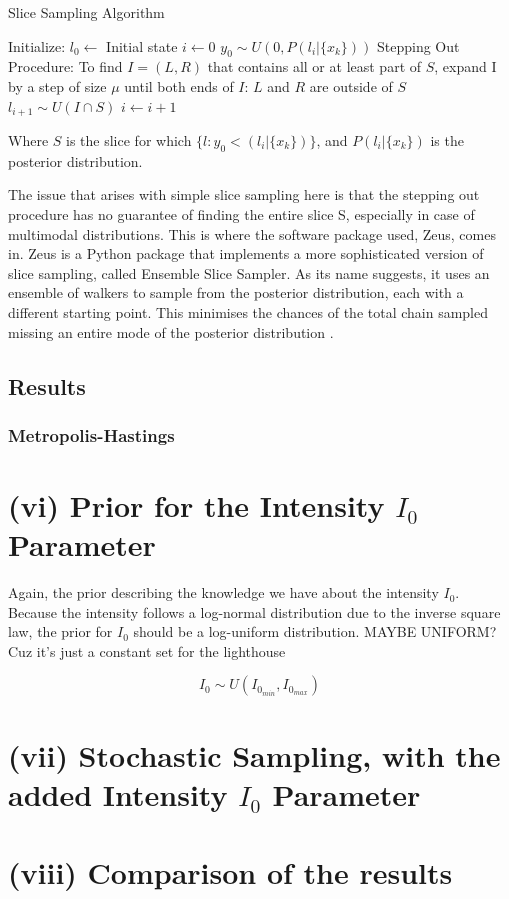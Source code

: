 \documentclass[12pt]{report} %
\begin{document}
\begin{definitionbox}{Slice Sampling Algorithm \cite{karamanis_zeus}}
\fontsize{8}{12}\selectfont
    \begin{algorithmic}[1]
        \State Initialize:
        \State \quad $l_0 \gets$ Initial state
        \State \quad $i \gets 0$
         
            \State $y_{0} \sim U(0, P(l_{i}|\{x_{k}\}))$
            \State Stepping Out Procedure: To find $I = (L, R)$ that contains all or at least part of $S$, expand I by a step of size $\mu$ until both ends of $I$: $L$ and $R$ are outside of $S$
            \State $l_{i+1} \sim U(I \cap S)$ 
            \State $i \gets i + 1$
        \EndWhile
    \end{algorithmic}
    Where $S$ is the slice for which $\{l: y_{0} < (l_{i}|\{x_{k}\})\}$, and $P(l_{i}|\{x_{k}\})$ is the posterior distribution.
\end{definitionbox}

The issue that arises with simple slice sampling here is that the stepping out procedure has no guarantee of finding the entire slice S, especially in case of multimodal distributions. This is where the software package used, Zeus, comes in. Zeus is a Python package that implements a more sophisticated version of slice sampling, called Ensemble Slice Sampler. As its name suggests, it uses an ensemble of walkers to sample from the posterior distribution, each with a different starting point. This minimises the chances of the total chain sampled missing an entire mode of the posterior distribution \cite{karamanis_zeus}.


\subsection*{Results}

\subsubsection*{Metropolis-Hastings}




\section*{(vi) Prior for the Intensity $I_{0}$ Parameter}

Again, the prior describing the knowledge we have about the intensity $I_{0}$. Because the intensity follows a log-normal distribution due to the inverse square law, the prior for $I_{0}$ should be a log-uniform distribution. MAYBE UNIFORM? Cuz it's just a constant set for the lighthouse

\begin{equation}
    I_{0} \sim U(I_{0_{min}}, I_{0_{max}})
\end{equation}

\section*{(vii) Stochastic Sampling, with the added Intensity $I_{0}$ Parameter}


\section*{(viii) Comparison of the results}




\end{document}

